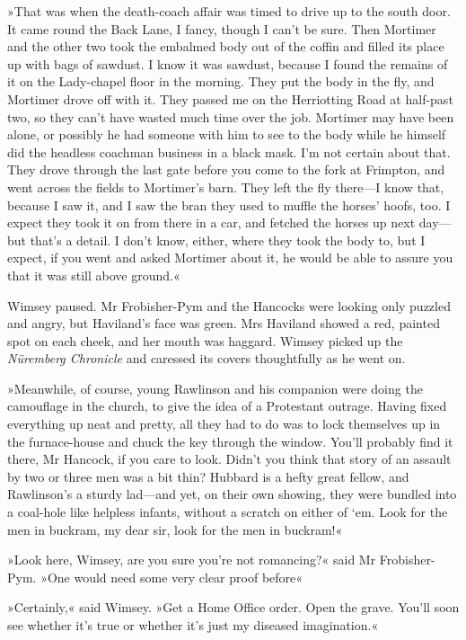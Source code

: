 »That was when the death-coach affair was timed to drive up to the south door. It came round the Back Lane, I fancy, though I can't be sure. Then Mortimer and the other two took the embalmed body out of the coffin and filled its place up with bags of sawdust. I know it was sawdust, because I found the remains of it on the Lady-chapel floor in the morning. They put the body in the fly, and Mortimer drove off with it. They passed me on the Herriotting Road at half-past two, so they can't have wasted much time over the job. Mortimer may have been alone, or possibly he had someone with him to see to the body while he himself did the headless coachman business in a black mask. I'm not certain about that. They drove through the last gate before you come to the fork at Frimpton, and went across the fields to Mortimer's barn. They left the fly there—I know that, because I saw it, and I saw the bran they used to muffle the horses' hoofs, too. I expect they took it on from there in a car, and fetched the horses up next day—but that's a detail. I don't know, either, where they took the body to, but I expect, if you went and asked Mortimer about it, he would be able to assure you that it was still above ground.«

Wimsey paused. Mr Frobisher-Pym and the Hancocks were looking only puzzled and angry, but Haviland's face was green. Mrs Haviland showed a red, painted spot on each cheek, and her mouth was haggard. Wimsey picked up the \textit{Nüremberg Chronicle} and caressed its covers thoughtfully as he went on.

»Meanwhile, of course, young Rawlinson and his companion were doing the camouflage in the church, to give the idea of a Protestant outrage. Having fixed everything up neat and pretty, all they had to do was to lock themselves up in the furnace-house and chuck the key through the window. You'll probably find it there, Mr Hancock, if you care to look. Didn't you think that story of an assault by two or three men was a bit thin? Hubbard is a hefty great fellow, and Rawlinson's a sturdy lad—and yet, on their own showing, they were bundled into a coal-hole like helpless infants, without a scratch on either of `em. Look for the men in buckram, my dear sir, look for the men in buckram!«

»Look here, Wimsey, are you sure you're not romancing?« said Mr Frobisher-Pym. »One would need some very clear proof before\longdash«

»Certainly,« said Wimsey. »Get a Home Office order. Open the grave. You'll soon see whether it's true or whether it's just my diseased imagination.«

